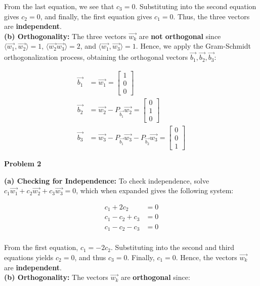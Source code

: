 \documentclass[letterpaper,11pt]{article}
\newcommand{\problem}[1]{
    \vspace{10pt}
    {\color{blue}\textbf{\Large Problem #1}}\\
    \vspace{-5pt}
}
\begin{document}
From the last equation, we see that $c_3 = 0$. Substituting into the second equation gives $c_2 = 0$, and finally, the first equation gives $c_1 = 0$.  
Thus, the three vectors are \textbf{independent}. \\

\textbf{(b) Orthogonality:}  
The three vectors $\vec{w_k}$ are \textbf{not orthogonal} since $\langle \vec{w_1}, \vec{w_2} \rangle = 1$, $\langle \vec{w_2}\vec{w_3} \rangle = 2$, and $\langle \vec{w_1}, \vec{w_3} \rangle = 1$. 
Hence, we apply the Gram-Schmidt orthogonalization process, obtaining the orthogonal vectors $\vec{b_1}, \vec{b_2}, \vec{b_3}$:

\begin{align*}
    \vec{b_1} &= \vec{w_1} = \begin{bmatrix} 1 \\ 0 \\ 0 \end{bmatrix} \\
    \vec{b_2} &= \vec{w_2} - P_{\vec{b_1}} \vec{w_2} = \begin{bmatrix} 0 \\ 1 \\ 0 \end{bmatrix} \\
    \vec{b_3} &= \vec{w_3} - P_{\vec{b_1}} \vec{w_3} - P_{\vec{b_2}} \vec{w_3} = \begin{bmatrix} 0 \\ 0 \\ 1 \end{bmatrix}
\end{align*}

\problem{2}

\textbf{(a) Checking for Independence:}  
To check independence, solve $c_1 \vec{w_1} + c_2 \vec{w_2} + c_3 \vec{w_3} = 0$, which when expanded gives the following system:

\begin{align*}
    c_1 + 2c_2 &= 0 \\
    c_1 - c_2 + c_3 &= 0 \\
    c_1 - c_2 - c_3 &= 0 \\
\end{align*}

From the first equation, $c_1 = -2c_2$. Substituting into the second and third equations yields $c_2 = 0$, and thus $c_3 = 0$. Finally, $c_1 = 0$.  
Hence, the vectors $\vec{w_k}$ are \textbf{independent}. \\

\textbf{(b) Orthogonality:}  
The vectors $\vec{w_k}$ are \textbf{orthogonal} since:
\end{document}
